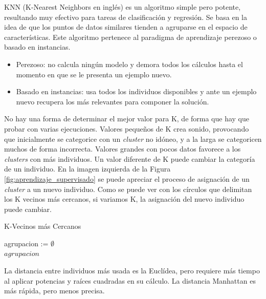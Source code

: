 		KNN (K-Nearest Neighbors en inglés) es un algoritmo simple pero potente, resultando muy efectivo para tareas de clasificación y regresión. Se basa en la idea de que los puntos de datos similares tienden a agruparse en el espacio de características. Este algoritmo pertenece al paradigma de aprendizaje perezoso o basado en instancias.
		
		\begin{itemize}
			\item Perezoso: no calcula ningún modelo y demora todos los cálculos hasta el momento en que se le presenta un ejemplo nuevo.			
			\item Basado en instancias: usa todos los individuos disponibles y ante un ejemplo nuevo recupera los más relevantes para componer la solución.	
		\end{itemize}
		
		No hay una forma de determinar el mejor valor para K, de forma que hay que probar con varias ejecuciones. Valores pequeños de K crea sonido, provocando que inicialmente se categorice con un \textit{cluster} no idóneo, y a la larga se categoricen muchos de forma incorrecta. Valores grandes con pocos datos favorece a los \textit{clusters} con más individuos. Un valor diferente de K puede cambiar la categoría de un individuo. En la imagen izquierda de la Figura \ref{fig:aprendizaje_supervisado} se puede apreciar el proceso de asignación de un \textit{cluster} a un nuevo individuo. Como se puede ver con los círculos que delimitan los K vecinos más cercanos, si variamos K, la asignación del nuevo individuo puede cambiar.

		\begin{algorithm}
			\caption{K-Vecinos más Cercanos}
			agrupacion := $\emptyset$\\
			\Return $agrupacion$
		\end{algorithm}
		
		La distancia entre individuos más usada es la Euclídea, pero requiere más tiempo al aplicar potencias y raíces cuadradas en su cálculo. La distancia Manhattan es más rápida, pero menos precisa.




